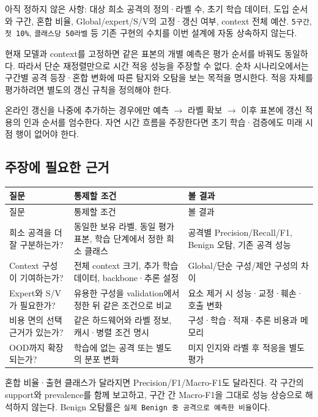 아직 정하지 않은 사항: 대상 희소 공격의 정의·라벨 수, 초기 학습 데이터, 도입 순서와 구간, 혼합 비율, Global/\allowbreak{}expert/\allowbreak{}S/\allowbreak{}V의 고정·갱신 여부, context 전체 예산. \texttt{5구간}, \texttt{첫 10\%}, \texttt{클래스당 50라\allowbreak{}벨} 등 기존 구현의 수치를 이번 설계에 자동 상속하지 않는다.

현재 모델과 context를 고정하면 같은 표본의 개별 예측은 평가 순서를 바꿔도 동일하다. 따라서 단순 재정렬만으로 시간 적응 성능을 주장할 수 없다. 순차 시나리오에서는 구간별 공격 등장·혼합 변화에 따른 탐지와 오탐을 보는 목적을 명시한다. 적응 자체를 평가하려면 별도의 갱신 규칙을 정의해야 한다.

온라인 갱신을 나중에 추가하는 경우에만 예측  \ensuremath{\rightarrow}  라벨 확보  \ensuremath{\rightarrow}  이후 표본에 갱신 적용의 인과 순서를 엄수한다. 자연 시간 흐름을 주장한다면 초기 학습·검증에도 미래 시점 행이 없어야 한다.

\subsection{주장에 필요한 근거}
\begingroup
\footnotesize
\begin{longtable}{>{\raggedright\arraybackslash}p{}>{\raggedright\arraybackslash}p{}>{\raggedright\arraybackslash}p{}}
\toprule
질문 & 통제할 조건 & 볼 결과 \\ \midrule
\endfirsthead
질문 & 통제할 조건 & 볼 결과 \\ \midrule
\endhead
{}희소 공격을 더 잘 구분하는가? & 동일한 보유 라벨, 동일 평가 표본, 학습 단계에서 정한 희소 클래스 & 공격별 Precision/\allowbreak{}Recall/\allowbreak{}F1, Benign 오탐, 기존 공격 성능 \\
{}Context 구성이 기여하는가? & 전체 context 크기, 추가 학습 데이터, backbone·추론 설정 & Global/\allowbreak{}단순 구성/\allowbreak{}제안 구성의 차이 \\
{}Expert와 S/\allowbreak{}V가 필요한가? & 유용한 구성을 validation에서 정한 뒤 같은 조건으로 비교 & 요소 제거 시 성능·교정·훼손·호출 변화 \\
{}비용 면의 선택 근거가 있는가? & 같은 하드웨어와 라벨 정보, 캐시·병렬 조건 명시 & 구성·학습·적재·추론 비용과 메모리 \\
{}OOD까지 확장되는가? & 학습에 없는 공격 또는 별도의 분포 변화 & 미지 인지와 라벨 후 적응을 별도 평가 \\
\bottomrule
\end{longtable}
\endgroup
혼합 비율·출현 클래스가 달라지면 Precision/\allowbreak{}F1/\allowbreak{}Macro-F1도 달라진다. 각 구간의 support와 prevalence를 함께 보고하고, 구간 간 Macro-F1을 그대로 성능 상승으로 해석하지 않는다. Benign 오탐률은 \texttt{실제 Benig\allowbreak{}n 중 공격으로\allowbreak{} 예측한 비율}이다.

